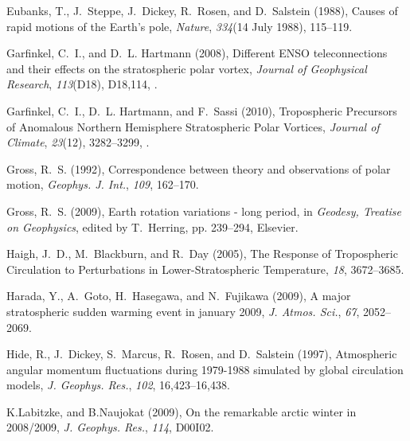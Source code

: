 \documentclass[draft,jgrga]{agutex}
\begin{document}
\begin{article}
\begin{thebibliography}{38}
Eubanks, T., J.~Steppe, J.~Dickey, R.~Rosen, and D.~Salstein (1988), Causes of
  rapid motions of the {E}arth's pole, \textit{Nature}, \textit{334}(14 July
  1988), 115--119.

Garfinkel, C.~I., and D.~L. Hartmann (2008), {Different ENSO teleconnections
  and their effects on the stratospheric polar vortex}, \textit{Journal of
  Geophysical Research}, \textit{113}(D18), D18,114,
  .

Garfinkel, C.~I., D.~L. Hartmann, and F.~Sassi (2010), {Tropospheric Precursors
  of Anomalous Northern Hemisphere Stratospheric Polar Vortices},
  \textit{Journal of Climate}, \textit{23}(12), 3282--3299,
  .

Gross, R.~S. (1992), Correspondence between theory and observations of polar
  motion, \textit{Geophys. J. Int.}, \textit{109}, 162--170.

Gross, R.~S. (2009), Earth rotation variations - long period, in
  \textit{Geodesy, Treatise on Geophysics}, edited by T.~Herring, pp. 239--294,
  Elsevier.

Haigh, J.~D., M.~Blackburn, and R.~Day (2005), {The Response of Tropospheric
  Circulation to Perturbations in Lower-Stratospheric Temperature},
  \textit{18}, 3672--3685.

Harada, Y., A.~Goto, H.~Hasegawa, and N.~Fujikawa (2009), A major stratospheric
  sudden warming event in january 2009, \textit{J. Atmos. Sci.}, \textit{67},
  2052--2069.

Hide, R., J.~Dickey, S.~Marcus, R.~Rosen, and D.~Salstein (1997), Atmospheric
  angular momentum fluctuations during 1979-1988 simulated by global
  circulation models, \textit{J. Geophys. Res.}, \textit{102}, 16,423--16,438.

K.Labitzke, and B.Naujokat (2009), On the remarkable arctic winter in
  2008/2009, \textit{J. Geophys. Res.}, \textit{114}, D00I02.


\end{thebibliography}
\end{article}
\end{document}
